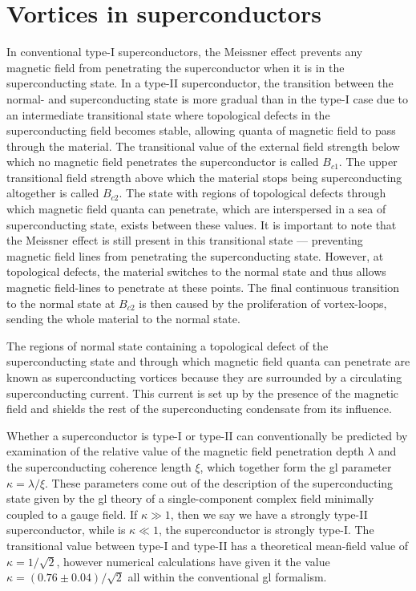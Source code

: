 \chapter{Vortices in superconductors}
\label{sec:Vor}
%
\noindent In conventional type-I superconductors, the Meissner effect prevents any magnetic field from penetrating the superconductor when it is in the
superconducting state. In a type-II superconductor, the transition between the normal- and superconducting state is more gradual than in the type-I case
due to an intermediate transitional state where topological defects in the superconducting field  becomes stable, allowing quanta of magnetic field
to pass through the material. The transitional value of the external field strength below which no magnetic field penetrates the superconductor is
called $B_{c1}$. The upper transitional field strength above which the material stops being superconducting altogether is called $B_{c2}$. The state
with regions of topological defects through which magnetic field quanta can penetrate, which are interspersed in a sea of
superconducting state, exists between these values. It is important to note that the Meissner effect is still present in this transitional state --- preventing magnetic field
lines from penetrating the superconducting state. However, at topological defects, the material switches to the normal state and thus
allows magnetic field-lines to penetrate at these points. The final continuous transition to the normal state at $B_{c2}$ is then caused by the
proliferation of vortex-loops, sending the whole material to the normal state.

The regions of normal state containing a topological defect of the superconducting state and through which magnetic field quanta can penetrate are known
as superconducting vortices because they are surrounded by a circulating superconducting current. This current is set up by the presence of the magnetic field
and shields the rest of the superconducting condensate from its influence.

Whether a superconductor is type-I or type-II can conventionally be predicted by examination of the relative value of the magnetic field penetration depth $\lambda$ and the superconducting
coherence length $\xi$, which together form the \ac{gl} parameter $\kappa = \lambda/\xi$.
These parameters come out of the description of the superconducting state given by the \ac{gl} theory of a single-component complex field minimally coupled
to a gauge field.
If $\kappa\gg1$, then we say we have a strongly
type-II superconductor, while is $\kappa\ll1$, the superconductor is strongly type-I. The transitional value between type-I and type-II has a theoretical
mean-field value of $\kappa = 1/\sqrt{2}$, however numerical calculations have given it the value $\kappa = (0.76\pm0.04)/\sqrt{2}$ all within the conventional
\ac{gl} formalism.

